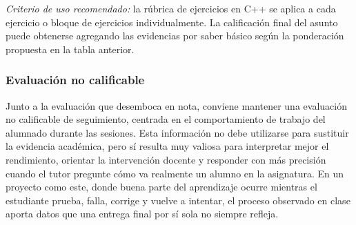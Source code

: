 \documentclass[a4paper,12pt]{article}
\begin{document}
\noindent\textit{Criterio de uso recomendado:} la rúbrica de ejercicios en C++ se aplica a cada ejercicio o bloque de ejercicios individualmente. La calificación final del asunto puede obtenerse agregando las evidencias por saber básico según la ponderación propuesta en la tabla anterior.
\normalsize


\subsubsection{Evaluación no calificable}

\normalsize
Junto a la evaluación que desemboca en nota, conviene mantener una evaluación no calificable de seguimiento, centrada en el comportamiento de trabajo del alumnado durante las sesiones. Esta información no debe utilizarse para sustituir la evidencia académica, pero sí resulta muy valiosa para interpretar mejor el rendimiento, orientar la intervención docente y responder con más precisión cuando el tutor pregunte cómo va realmente un alumno en la asignatura. En un proyecto como este, donde buena parte del aprendizaje ocurre mientras el estudiante prueba, falla, corrige y vuelve a intentar, el proceso observado en clase aporta datos que una entrega final por sí sola no siempre refleja.
\end{document}
